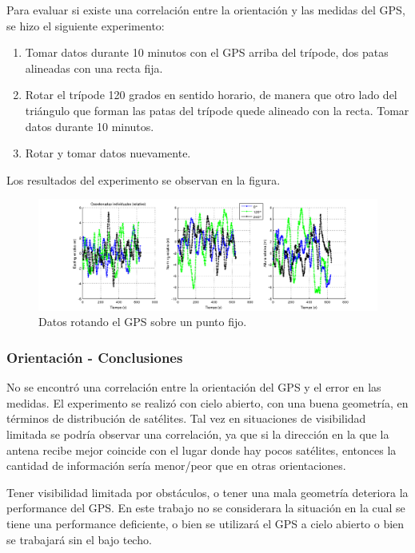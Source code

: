 \documentclass[main]{subfiles}
\begin{document}
Para evaluar si existe una correlación entre la orientación y las medidas del GPS, se hizo el siguiente experimento:
\begin{enumerate}
\item Tomar datos durante 10 minutos con el GPS arriba del trípode, dos patas alineadas con una recta fija.
\item Rotar el trípode 120 grados en sentido horario, de manera que otro lado del triángulo que forman las patas del trípode quede alineado con la recta. Tomar datos durante 10 minutos.
\item Rotar y tomar datos nuevamente.
\end{enumerate}

Los resultados del experimento se observan en la figura.

\begin{figure}[h!]
\hspace{-70pt}
  \includegraphics[width=1.4\textwidth]{./pics_gps/orientacion_individual.png}
  \caption{Datos rotando el GPS sobre un punto fijo.}
  \label{fig:orientacion_individual.png}
\end{figure}

\subsubsection{Orientación - Conclusiones}
\label{sec:orientacion-conclusiones}

No se encontró una correlación entre la orientación del GPS y el error en las medidas.
El experimento se realizó con cielo abierto, con una buena geometría, en términos de distribución de satélites. Tal vez en situaciones de visibilidad limitada se podría observar una correlación, ya que si la dirección en la que la antena recibe mejor coincide con el lugar donde hay pocos satélites, entonces la cantidad de información sería menor/peor que en otras orientaciones.

Tener visibilidad limitada por obstáculos, o tener una mala geometría deteriora la performance del GPS. En este trabajo no se considerara la situaci\'on en la cual se tiene una performance deficiente, o bien se utilizar\'a el GPS a cielo abierto o bien se trabajar\'a sin el bajo techo.
\end{document}
